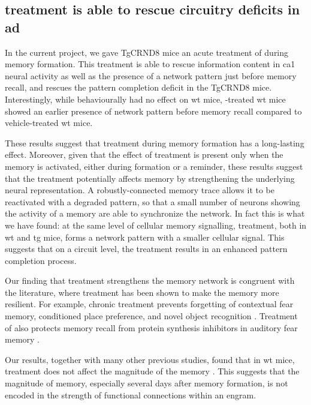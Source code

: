 \subsection{\tglu{} treatment is able to rescue circuitry deficits in \gls{ad}}

In the current project, we gave TgCRND8 mice an acute treatment of \tglu{} during memory formation. This treatment is able to rescue information content in \gls{ca1} neural activity as well as the presence of a network pattern just before memory recall, and rescues the pattern completion deficit in the TgCRND8 mice. Interestingly, while behaviourally \tglu{} had no effect on \gls{wt} mice, \tglu-treated \gls{wt} mice showed an earlier presence of network pattern before memory recall compared to vehicle-treated \gls{wt} mice. 

These results suggest that \tglu{} treatment during memory formation has a long-lasting effect. Moreover, given that the effect of \tglu{} treatment is present only when the memory is activated, either during formation or a reminder, these results suggest that the \tglu{} treatment potentially affects memory by strengthening the underlying neural representation. A robustly-connected memory trace allows it to be reactivated with a degraded pattern, so that a small number of neurons showing the activity of a memory are able to synchronize the network. In fact this is what we have found: at the same level of cellular memory signalling, \tglu{} treatment, both in \gls{wt} and \gls{tg} mice, forms a network pattern with a smaller cellular signal. This suggests that on a circuit level, the \tglu{} treatment results in an enhanced pattern completion process.

Our finding that \tglu{} treatment strengthens the memory network is congruent with the literature, where \tglu{} treatment has been shown to make the memory more resilient. For example, chronic \tglu{} treatment prevents forgetting of contextual fear memory, conditioned place preference, and novel object recognition \citep{dong15, migues16}. Treatment of \tglu{} also protects memory recall from protein synthesis inhibitors in auditory fear memory \citep{lopez15}. 

Our results, together with many other previous studies, found that in \gls{wt} mice, \tglu{} treatment does not affect the magnitude of the memory \citep{dias12, dong15, migues16}.  This suggests that the magnitude of memory, especially several days after memory formation, is not encoded in the strength of functional connections within an engram.


